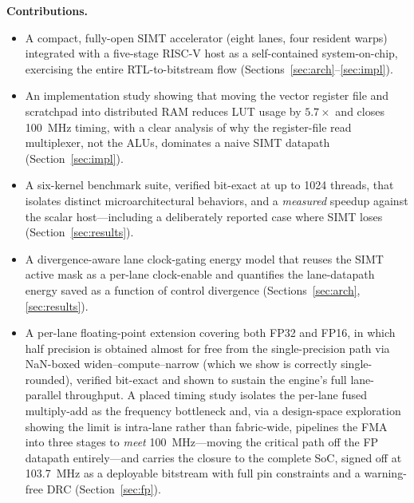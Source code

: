 \documentclass[conference]{IEEEtran}
\begin{document}
\noindent\textbf{Contributions.}
\begin{itemize}
\item A compact, fully-open SIMT accelerator (eight lanes, four resident warps)
integrated with a five-stage RISC-V host as a self-contained
system-on-chip, exercising the entire RTL-to-bitstream flow
(Sections~\ref{sec:arch}--\ref{sec:impl}).
\item An implementation study showing that moving the vector register file and
scratchpad into distributed RAM reduces LUT usage by $5.7\times$ and closes
100~MHz timing, with a clear analysis of why the register-file read multiplexer,
not the ALUs, dominates a naive SIMT datapath (Section~\ref{sec:impl}).
\item A six-kernel benchmark suite, verified bit-exact at up to 1024 threads,
that isolates distinct microarchitectural behaviors, and a \emph{measured}
speedup against the scalar host---including a deliberately reported case where
SIMT loses (Section~\ref{sec:results}).
\item A divergence-aware lane clock-gating energy model that reuses the SIMT
active mask as a per-lane clock-enable and quantifies the lane-datapath energy
saved as a function of control divergence (Sections~\ref{sec:arch},
\ref{sec:results}).
\item A per-lane floating-point extension covering both FP32 and FP16, in which
half precision is obtained almost for free from the single-precision path via
NaN-boxed widen--compute--narrow (which we show is correctly single-rounded),
verified bit-exact and shown to sustain the engine's full lane-parallel
throughput. A placed timing study isolates the per-lane fused multiply-add as the
frequency bottleneck and, via a design-space exploration showing the limit is
intra-lane rather than fabric-wide, pipelines the FMA into three stages to
\emph{meet} 100~MHz---moving the critical path off the FP datapath entirely---and
carries the closure to the complete SoC, signed off at 103.7~MHz as a deployable
bitstream with full pin constraints and a warning-free DRC
(Section~\ref{sec:fp}).
\end{itemize}

\end{document}
